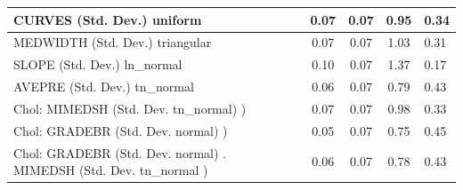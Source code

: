 \begin{table}
\begin{center}
\begin{tabular}{|l|l|c|c|c|l|}
			\hline
			CURVES (Std. Dev.) uniform &  & 0.07 & 0.07 & 0.95 & 0.34 \\
			\hline
			MEDWIDTH (Std. Dev.) triangular &  & 0.07 & 0.07 & 1.03 & 0.31 \\
			\hline
			SLOPE (Std. Dev.) ln_normal &  & 0.10 & 0.07 & 1.37 & 0.17 \\
			\hline
			AVEPRE (Std. Dev.) tn_normal &  & 0.06 & 0.07 & 0.79 & 0.43 \\
			\hline
			 Chol: MIMEDSH (Std. Dev. tn_normal) ) &  & 0.07 & 0.07 & 0.98 & 0.33 \\
			\hline
			 Chol: GRADEBR (Std. Dev. normal) ) &  & 0.05 & 0.07 & 0.75 & 0.45 \\
			\hline
			 Chol: GRADEBR (Std. Dev. normal) . MIMEDSH (Std. Dev.   tn_normal ) &  & 0.06 & 0.07 & 0.78 & 0.43 \\
			\hline
		\end{tabular}
	\end{center}
\end{table}